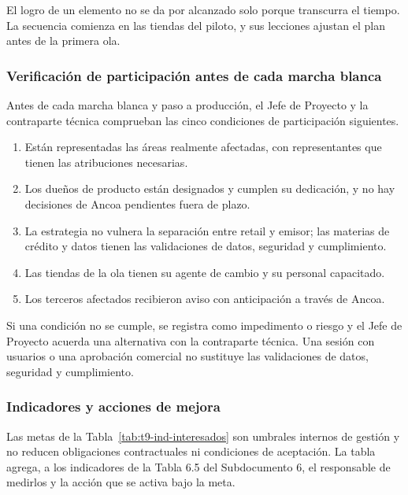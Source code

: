 \documentclass[11pt]{article}
\providecommand{\tightlist}{%
  \setlength{\itemsep}{0pt}\setlength{\parskip}{0pt}}
\begin{document}
El logro de un elemento no se da por alcanzado solo porque transcurra el tiempo. La secuencia comienza en las tiendas del piloto, y sus lecciones ajustan el plan antes de la primera ola.

\subsubsection{Verificación de participación antes de cada marcha blanca}\label{t9-4-verificacion}

Antes de cada marcha blanca y paso a producción, el Jefe de Proyecto y la contraparte técnica comprueban las cinco condiciones de participación siguientes.

\begin{enumerate}
\tightlist
\item
  Están representadas las áreas realmente afectadas, con representantes que tienen las atribuciones necesarias.
\item
  Los dueños de producto están designados y cumplen su dedicación, y no hay decisiones de Ancoa pendientes fuera de plazo.
\item
  La estrategia no vulnera la separación entre retail y emisor; las materias de crédito y datos tienen las validaciones de datos, seguridad y cumplimiento.
\item
  Las tiendas de la ola tienen su agente de cambio y su personal capacitado.
\item
  Los terceros afectados recibieron aviso con anticipación a través de Ancoa.
\end{enumerate}

Si una condición no se cumple, se registra como impedimento o riesgo y el Jefe de Proyecto acuerda una alternativa con la contraparte técnica. Una sesión con usuarios o una aprobación comercial no sustituye las validaciones de datos, seguridad y cumplimiento.

\subsubsection{Indicadores y acciones de mejora}\label{t9-4-indicadores}

Las metas de la Tabla~\mbox{\ref{tab:t9-ind-interesados}} son umbrales internos de gestión y no reducen obligaciones contractuales ni condiciones de aceptación. La tabla agrega, a los indicadores de la Tabla 6.5 del Subdocumento 6, el responsable de medirlos y la acción que se activa bajo la meta.
\end{document}
